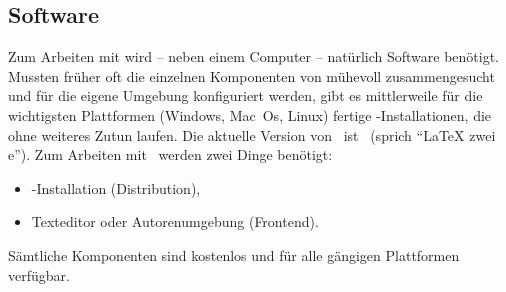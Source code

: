 \subsection{Software}
\label{sec:Software}

Zum Arbeiten mit \latex wird -- neben einem Computer -- natürlich Software benötigt. Mussten früher oft die einzelnen Komponenten von \latex mühevoll zusammengesucht und für die eigene Umgebung konfiguriert werden, gibt es mittlerweile für die wichtigsten Plattformen (Windows, Mac~Os, Linux) fertige \latex-Installationen, die ohne weiteres Zutun laufen. Die aktuelle Version von \latex\ ist \LaTeXe\ (sprich "`LaTeX zwei e"'). 
Zum Arbeiten mit \latex\ werden zwei Dinge benötigt:
%
\begin{itemize}
\item \latex-Installation (Distribution),
\item Texteditor oder Autorenumgebung (Frontend).
\end{itemize}
%
Sämtliche Komponenten sind kostenlos und für alle gängigen Plattformen verfügbar.

